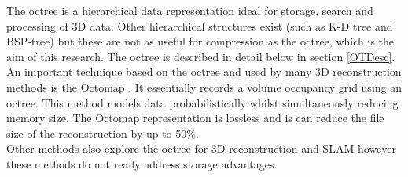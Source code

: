 The octree is a hierarchical data representation ideal for storage, search and processing of 3D data. Other hierarchical structures exist (such as K-D tree and BSP-tree) \cite{Samet06Foundations} but these are not as useful for compression as the octree, which is the aim of this research. The octree is described in detail below in section \ref{OTDesc}. An important technique based on the octree and used by many 3D reconstruction methods is the Octomap \cite{Wurm10Octomap}. It essentially records a volume occupancy grid using an octree. This method models data probabilistically whilst simultaneously reducing memory size. The Octomap representation is lossless and is can reduce the file size of the reconstruction by up to 50\%. \\

Other methods also explore the octree for 3D reconstruction and SLAM \cite{Fournier07Mapping,Meagher82Geometric,Fairfield07Real} however these methods do not really address storage advantages. 



